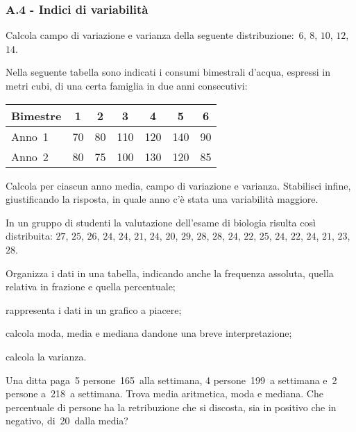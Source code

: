 \subsubsection*{A.4 - Indici di variabilità}

\begin{esercizio}
\label{ese:A.34}
Calcola campo di variazione e varianza della seguente distribuzione:~$6$, $8$, $10$, $12$, $14$.
\end{esercizio}

\begin{esercizio}
\label{ese:A.35}
Nella seguente tabella sono indicati i consumi bimestrali d'acqua, espressi in metri cubi, di una certa famiglia in due anni consecutivi:
\begin{center}
 \begin{tabular}{l*{6}{c}}
\toprule
Bimestre & 1 & 2 & 3 & 4 & 5 & 6 \\
\midrule
Anno~1 & 70 & 80 & 110 & 120 & 140 & 90 \\
Anno~2 & 80 & 75 & 100 & 130 & 120 & 85 \\
\bottomrule
\end{tabular}
\end{center}
Calcola per ciascun anno media, campo di variazione e varianza. Stabilisci infine, giustificando la risposta, in quale anno c'è stata una variabilità maggiore.
\end{esercizio}

\begin{esercizio}
\label{ese:A.36}
In un gruppo di studenti la valutazione dell'esame di biologia risulta così distribuita:
$27$, $25$, $26$, $24$, $24$, $21$, $24$, $20$, $29$, $28$,
$28$, $24$, $22$, $25$, $24$, $22$, $24$, $21$, $23$, $28$.
\begin{enumeratea}
 \item Organizza i dati in una tabella, indicando anche la frequenza assoluta, quella relativa in frazione e quella percentuale;
 \item rappresenta i dati in un grafico a piacere;
 \item calcola moda, media e mediana dandone una breve interpretazione;
 \item calcola la varianza.
\end{enumeratea}
\end{esercizio}

\begin{esercizio}
\label{ese:A.37}
Una ditta paga~5 persone~165\officialeuro\ alla settimana, 4 persone~199\officialeuro\ a settimana e~2 persone a~218\officialeuro\ a settimana.
Trova media aritmetica, moda e mediana. Che percentuale di persone ha la retribuzione che si discosta,
sia in positivo che in negativo, di~20\officialeuro\ dalla media?
\end{esercizio}

